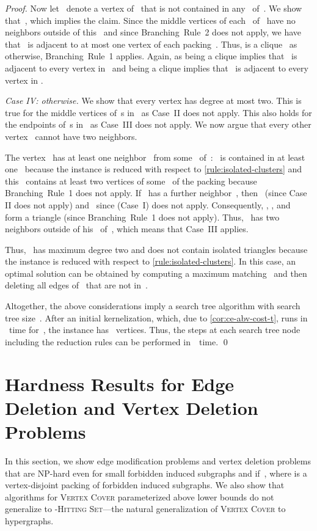 \documentclass[envcountsame,numbook,smallextended]{svjour3}
\numberwithin{equation}{section}
\numberwithin{figure}{section}
\begin{document}
\begin{proof}
  Now let~ denote a vertex of~ that is not contained in any~ of~. We
  show that~, which implies the claim. Since the middle vertices of each~
  of~ have no neighbors outside of this~ and since Branching~Rule~2 does not apply,
  we have that~ is adjacent to at most one vertex of each packing~. Thus,
   is a clique~ as otherwise, Branching~Rule~1 applies. Again,  as
   being a clique implies that~ is adjacent to every vertex
  in~ and  being a clique implies that~ is adjacent to
  every vertex in .
 


  \emph{Case IV: otherwise.}
  We show that every vertex has degree at most two.
  This is true for the middle vertices of~s in~
  as Case~II does not apply.
  This also holds for the endpoints of~s in~
  as Case~III does not apply.
  We now argue that every other vertex~ cannot have two neighbors. 

The vertex~ has at least one
  neighbor~ from some~  of~: ~is contained in at least one~
  because the instance is reduced with respect to \cref{rule:isolated-clusters} and
  this~ contains at least two vertices of some~ of the packing because Branching~Rule~1
  does not apply.  If~ has a further
  neighbor~, then~ (since Case II does not apply) and~ since (Case~I) does not apply.
  Consequently, , , and~ form a triangle (since Branching~Rule~1 does not
  apply). 
  Thus, ~has two neighbors outside of his~ of~,
  which means that Case~III applies.

  Thus, ~has maximum degree two and does not contain isolated triangles because the instance is reduced with respect to \cref{rule:isolated-clusters}. In this case, an optimal solution
  can be obtained by computing a maximum matching~ and then
  deleting all edges of~ that are not in~.
 
  Altogether,
  the above considerations imply
  a search tree algorithm
  with search tree size~. 
  After an initial kernelization, which,
  due to \cref{cor:ce-abv-cost-t}, runs in ~time
  for~, the instance has~ vertices.
  Thus, the steps at each search tree node
  including the reduction rules
  can be performed in~~time.
  \qed
\end{proof}

\section{Hardness Results for Edge Deletion and Vertex Deletion Problems}
\label{sec:hardness}
In this section, we show edge modification problems and vertex deletion problems that are NP-hard even for small forbidden induced subgraphs and if~, where  is a vertex-disjoint packing of forbidden induced subgraphs.  We also show that algorithms for \textsc{Vertex Cover} parameterized above lower bounds do not generalize to -\textsc{Hitting Set}---the natural generalization of \textsc{Vertex Cover} to hypergraphs.
\end{document}
